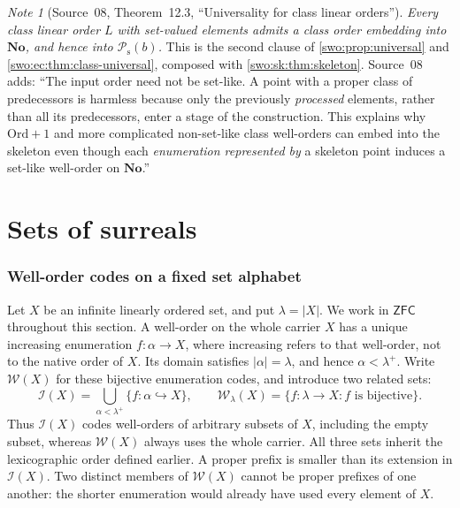 \documentclass[11pt]{article}
\theoremstyle{definition}
\theoremstyle{remark}
\newtheorem{note}[note]{Note}
\newcommand{\No}{\mathbf{No}}
\newcommand{\Ord}{\mathrm{Ord}}
\newcommand{\WO}{\mathcal W}
\newcommand{\Psupp}{\mathcal P_{\mathrm{s}}}
\newcommand{\ZFC}{\mathsf{ZFC}}
\newcommand{\card}[1]{\lvert #1\rvert}
\begin{document}
\begin{note}[Source~08, Theorem~12.3, ``Universality for class linear orders'']\label{swo:sk:thm:classuniversal}
\emph{Every class linear order $L$ with set-valued elements admits a class
order embedding into $\No$, and hence into $\Psupp(b)$.} This is the second
clause of \cref{swo:prop:universal} and \cref{swo:ec:thm:class-universal},
composed with \cref{swo:sk:thm:skeleton}. Source~08 adds: ``The input order
need not be set-like. A point with a proper class of predecessors is harmless
because only the previously \emph{processed} elements, rather than all its
predecessors, enter a stage of the construction. This explains why $\Ord+1$
and more complicated non-set-like class well-orders can embed into the
skeleton even though each \emph{enumeration represented by} a skeleton point
induces a set-like well-order on $\No$.''
\end{note}

\part{Sets of surreals}\label{swo:part:sets}

\section{Well-order codes on a fixed set alphabet}\label{swo:sw:fixed}

Let \(X\) be an infinite linearly ordered set, and put
\(\lambda=\card{X}\).  We work in \(\ZFC\) throughout this section.
A well-order on the whole carrier \(X\) has a unique increasing
enumeration \(f:\alpha\longrightarrow X\), where increasing refers to
that well-order, not to the native order of \(X\).  Its domain satisfies
\(\card{\alpha}=\lambda\), and hence \(\alpha<\lambda^+\).
Write \(\WO(X)\) for these bijective enumeration codes, and introduce
two related sets:
\[
 \mathcal I(X)=
 \bigcup_{\alpha<\lambda^+}\{f:\alpha\hookrightarrow X\},
 \qquad
 \WO_\lambda(X)=\{f:\lambda\longrightarrow X:
                                      f\text{ is bijective}\}.
\]
Thus \(\mathcal I(X)\) codes well-orders of arbitrary subsets of \(X\),
including the empty subset, whereas \(\WO(X)\) always uses the whole
carrier.  All three sets inherit the lexicographic order defined
earlier.  A proper prefix is smaller than its extension in
\(\mathcal I(X)\).  Two distinct members of \(\WO(X)\) cannot be proper
prefixes of one another: the shorter enumeration would already have
used every element of \(X\).
\end{document}
